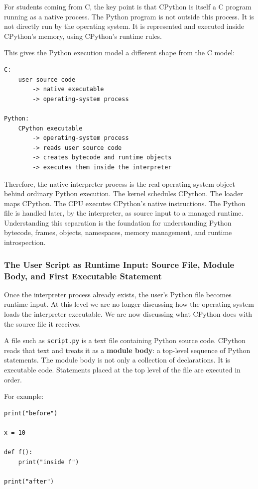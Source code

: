 \documentclass[a4paper,twoside]{report}
\begin{document}
For students coming from C, the key point is that CPython is itself a C program running as a native process. The Python program is not outside this process. It is not directly run by the operating system. It is represented and executed inside CPython's memory, using CPython's runtime rules.

This gives the Python execution model a different shape from the C model:

\begin{verbatim}
C:
    user source code
        -> native executable
        -> operating-system process

Python:
    CPython executable
        -> operating-system process
        -> reads user source code
        -> creates bytecode and runtime objects
        -> executes them inside the interpreter
\end{verbatim}

Therefore, the native interpreter process is the real operating-system object behind ordinary Python execution. The kernel schedules CPython. The loader maps CPython. The CPU executes CPython's native instructions. The Python file is handled later, by the interpreter, as source input to a managed runtime. Understanding this separation is the foundation for understanding Python bytecode, frames, objects, namespaces, memory management, and runtime introspection.



\subsubsection{The User Script as Runtime Input: Source File, Module Body, and First Executable Statement}

Once the interpreter process already exists, the user's Python file becomes runtime input. At this level we are no longer discussing how the operating system loads the interpreter executable. We are now discussing what CPython does with the source file it receives.

A file such as \texttt{script.py} is a text file containing Python source code. CPython reads that text and treats it as a \textbf{module body}: a top-level sequence of Python statements. The module body is not only a collection of declarations. It is executable code. Statements placed at the top level of the file are executed in order.

For example:

\begin{verbatim}
print("before")

x = 10

def f():
    print("inside f")

print("after")
\end{verbatim}
\end{document}
